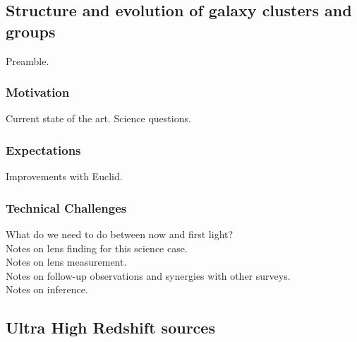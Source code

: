 \documentclass[twocolumn]{svjour3}
\begin{document}

\subsection{Structure and evolution of galaxy clusters and groups}


Preamble.

\subsubsection{Motivation}
Current state of the art. Science questions.\\

\subsubsection{Expectations}
Improvements with Euclid.\\

\subsubsection{Technical Challenges}

What do we need to do between now and first light?\\

Notes on lens finding for this science case.\\

Notes on lens measurement.\\

Notes on follow-up observations and synergies with other surveys.\\

Notes on inference.\\



\subsection{Ultra High Redshift sources}


\end{document}
